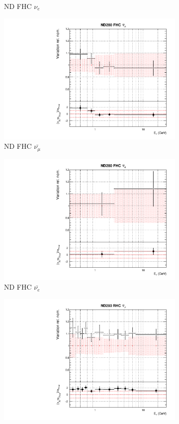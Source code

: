 \begin{figure}
\begin{subfigure}{0.24\textwidth}
  \caption{ND FHC $\nu_e$}
  \label{fig:}
\end{subfigure}
\begin{subfigure}{0.24\textwidth}
  \centering
  \includegraphics[width=0.95\linewidth]{figs/datflux2}
  \caption{ND FHC $\bar{\nu_{\mu}}$}
  \label{fig:}
\end{subfigure}
\begin{subfigure}{0.24\textwidth}
  \centering
  \includegraphics[width=0.95\linewidth]{figs/datflux3}
  \caption{ND FHC $\bar{\nu_{e}}$}
  \label{fig:}
\end{subfigure}
\begin{subfigure}{0.24\textwidth}
  \centering
  \includegraphics[width=0.95\linewidth]{figs/datflux4}

\end{subfigure}
\end{figure}

